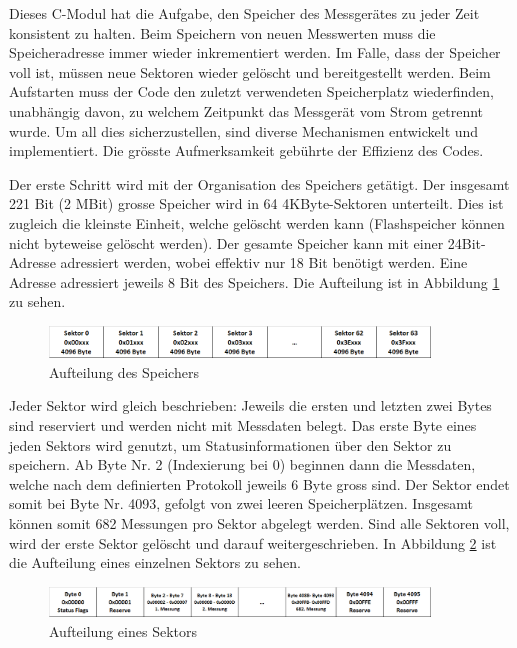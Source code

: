Dieses C-Modul hat die Aufgabe, den Speicher des Messgerätes zu jeder Zeit konsistent zu halten. Beim Speichern von neuen Messwerten muss die Speicheradresse immer wieder inkrementiert werden. Im Falle, dass der Speicher voll ist, müssen neue Sektoren wieder gelöscht und bereitgestellt werden. Beim Aufstarten muss der Code den zuletzt verwendeten Speicherplatz wiederfinden, unabhängig davon, zu welchem Zeitpunkt das Messgerät vom Strom getrennt wurde. Um all dies sicherzustellen, sind diverse Mechanismen entwickelt und implementiert. Die grösste Aufmerksamkeit gebührte der Effizienz des Codes. 

Der erste Schritt wird mit der Organisation des Speichers getätigt. Der insgesamt 221 Bit (2 MBit) grosse Speicher wird in 64 4KByte-Sektoren unterteilt. Dies ist zugleich die kleinste Einheit, welche gelöscht werden kann (Flashspeicher können nicht byteweise gelöscht werden). Der gesamte Speicher kann mit einer 24Bit-Adresse adressiert werden, wobei effektiv nur 18 Bit benötigt werden. Eine Adresse adressiert jeweils 8 Bit des Speichers. Die Aufteilung ist in Abbildung \ref{fig:Aufteilung_des_Speichers} zu sehen. 

\begin{figure}[H]
\begin{center}
\includegraphics[width=0.9\textwidth]{images/Software_Tabelle_2.png}
\caption{Aufteilung des Speichers}
\label{fig:Aufteilung_des_Speichers}
\end{center}
\end{figure}

Jeder Sektor wird gleich beschrieben: Jeweils die ersten und letzten zwei Bytes sind reserviert und werden nicht mit Messdaten belegt. Das erste Byte eines jeden Sektors wird genutzt, um Statusinformationen über den Sektor zu speichern. Ab Byte Nr. 2 (Indexierung bei 0) beginnen dann die Messdaten, welche nach dem definierten Protokoll jeweils 6 Byte gross sind. Der Sektor endet somit bei Byte Nr. 4093, gefolgt von zwei leeren Speicherplätzen. Insgesamt können somit 682 Messungen pro Sektor abgelegt werden. Sind alle Sektoren voll, wird der erste Sektor gelöscht und darauf weitergeschrieben. In Abbildung \ref{fig:Aufteilung_eines_Sektors} ist die Aufteilung eines einzelnen Sektors zu sehen.

\begin{figure}[H]
\begin{center}
\includegraphics[width=0.9\textwidth]{images/Software_Tabelle_3.png}
\caption{Aufteilung eines Sektors}
\label{fig:Aufteilung_eines_Sektors}
\end{center}
\end{figure}

